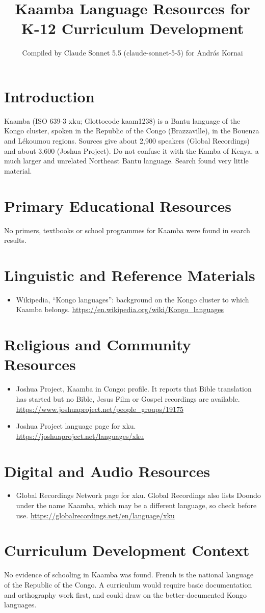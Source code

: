 \documentclass[12pt]{article}
\title{Kaamba Language Resources for K-12 Curriculum Development}
\author{Compiled by Claude Sonnet 5.5 (claude-sonnet-5-5) for Andr\'as Kornai}
\date{}
\begin{document}
\maketitle

\section{Introduction}
Kaamba (ISO 639-3 xku; Glottocode kaam1238) is a Bantu language of the Kongo cluster, spoken in the Republic of the Congo (Brazzaville), in the Bouenza and L\'ekoumou regions. Sources give about 2,900 speakers (Global Recordings) and about 3,600 (Joshua Project). Do not confuse it with the Kamba of Kenya, a much larger and unrelated Northeast Bantu language. Search found very little material.

\section{Primary Educational Resources}
No primers, textbooks or school programmes for Kaamba were found in search results.

\section{Linguistic and Reference Materials}
\begin{itemize}
\item Wikipedia, ``Kongo languages'': background on the Kongo cluster to which Kaamba belongs. \url{https://en.wikipedia.org/wiki/Kongo_languages}
\end{itemize}

\section{Religious and Community Resources}
\begin{itemize}
\item Joshua Project, Kaamba in Congo: profile. It reports that Bible translation has started but no Bible, Jesus Film or Gospel recordings are available. \url{https://www.joshuaproject.net/people_groups/19175}
\item Joshua Project language page for xku. \url{https://joshuaproject.net/languages/xku}
\end{itemize}

\section{Digital and Audio Resources}
\begin{itemize}
\item Global Recordings Network page for xku. Global Recordings also lists Doondo under the name Kaamba, which may be a different language, so check before use. \url{https://globalrecordings.net/en/language/xku}
\end{itemize}

\section{Curriculum Development Context}
No evidence of schooling in Kaamba was found. French is the national language of the Republic of the Congo. A curriculum would require basic documentation and orthography work first, and could draw on the better-documented Kongo languages.
\end{document}
